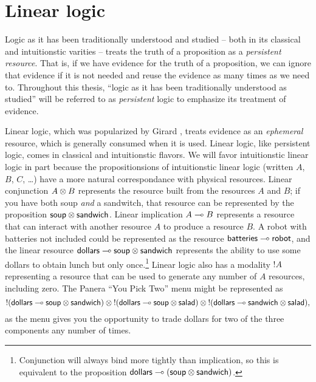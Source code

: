 
\chapter{Linear logic}

Logic as it has been traditionally understood and studied -- both in
its classical and intuitionstic varities -- treats the truth of a
proposition as a {\it persistent resource}. That is, if we have
evidence for the truth of a proposition, we can ignore that evidence
if it is not needed and reuse the evidence as many times as we need
to. Throughout this thesis, ``logic as it has been traditionally
understood as studied'' will be referred to as {\it persistent} logic
to emphasize its treatment of evidence. 

Linear logic, which was popularized by Girard \cite{girard87linear},
treats evidence as an {\it ephemeral} resource, which is generally
consumed when it is used. Linear logic, like persistent logic, comes
in classical and intuitionstic flavors. We will favor intuitionstic
linear logic in part because the propositionsions of intuitionstic
linear logic (written $A$, $B$, $C$, \ldots) have a more natural
correspondance with physical resources. Linear conjunction $A \otimes
B$ represents the resource built from the resources $A$ and $B$; if
you have both soup {\it and} a sandwitch, that resource can be
represented by the proposition ${\sf soup} \otimes {\sf
  sandwich}$. Linear implication $A \multimap B$ represents a resource
that can interact with another resource $A$ to produce a resource
$B$. A robot with batteries not included could be represented as the
resource ${\sf batteries} \multimap {\sf robot}$, and the linear resource
${\sf dollars} \multimap {\sf soup} \otimes {\sf sandwich}$ represents
the ability to use some dollars to obtain lunch but only
once.\footnote{Conjunction will always bind more tightly than
  implication, so this is equivalent to the proposition ${\sf dollars}
  \multimap ({\sf soup} \otimes {\sf sandwich})$.} Linear logic also has
a modality ${!}A$ representing a resource that can be used to generate
any number of $A$ resources, including zero. The Panera ``You Pick
Two'' menu might be represented as
\[ {!}({\sf dollars} \multimap {\sf soup} \otimes {\sf sandwich}) \otimes
{!}({\sf dollars} \multimap {\sf soup} \otimes {\sf salad}) \otimes
{!}({\sf dollars} \multimap {\sf sandwich} \otimes {\sf salad}),\] as the
menu gives you the opportunity to trade dollars for two of the three
components any number of times.







